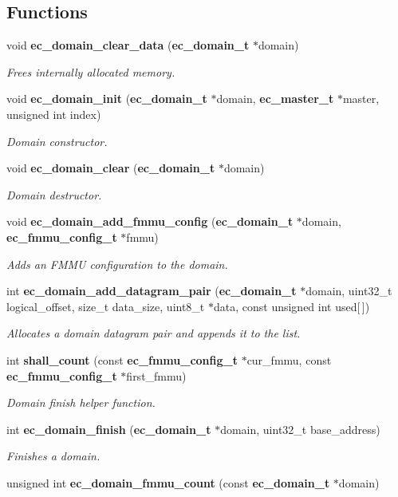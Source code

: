 \subsection*{\-Functions}
\begin{DoxyCompactItemize}
\item 
void {\bf ec\-\_\-domain\-\_\-clear\-\_\-data} ({\bf ec\-\_\-domain\-\_\-t} $\ast$domain)
\begin{DoxyCompactList}\small\item\em \-Frees internally allocated memory. \end{DoxyCompactList}\item 
void {\bf ec\-\_\-domain\-\_\-init} ({\bf ec\-\_\-domain\-\_\-t} $\ast$domain, {\bf ec\-\_\-master\-\_\-t} $\ast$master, unsigned int index)
\begin{DoxyCompactList}\small\item\em \-Domain constructor. \end{DoxyCompactList}\item 
void {\bf ec\-\_\-domain\-\_\-clear} ({\bf ec\-\_\-domain\-\_\-t} $\ast$domain)
\begin{DoxyCompactList}\small\item\em \-Domain destructor. \end{DoxyCompactList}\item 
void {\bf ec\-\_\-domain\-\_\-add\-\_\-fmmu\-\_\-config} ({\bf ec\-\_\-domain\-\_\-t} $\ast$domain, {\bf ec\-\_\-fmmu\-\_\-config\-\_\-t} $\ast$fmmu)
\begin{DoxyCompactList}\small\item\em \-Adds an \-F\-M\-M\-U configuration to the domain. \end{DoxyCompactList}\item 
int {\bf ec\-\_\-domain\-\_\-add\-\_\-datagram\-\_\-pair} ({\bf ec\-\_\-domain\-\_\-t} $\ast$domain, uint32\-\_\-t logical\-\_\-offset, size\-\_\-t data\-\_\-size, uint8\-\_\-t $\ast$data, const unsigned int used[$\,$])
\begin{DoxyCompactList}\small\item\em \-Allocates a domain datagram pair and appends it to the list. \end{DoxyCompactList}\item 
int {\bf shall\-\_\-count} (const {\bf ec\-\_\-fmmu\-\_\-config\-\_\-t} $\ast$cur\-\_\-fmmu, const {\bf ec\-\_\-fmmu\-\_\-config\-\_\-t} $\ast$first\-\_\-fmmu)
\begin{DoxyCompactList}\small\item\em \-Domain finish helper function. \end{DoxyCompactList}\item 
int {\bf ec\-\_\-domain\-\_\-finish} ({\bf ec\-\_\-domain\-\_\-t} $\ast$domain, uint32\-\_\-t base\-\_\-address)
\begin{DoxyCompactList}\small\item\em \-Finishes a domain. \end{DoxyCompactList}\item 
unsigned int {\bf ec\-\_\-domain\-\_\-fmmu\-\_\-count} (const {\bf ec\-\_\-domain\-\_\-t} $\ast$domain)\label{domain_8c_a7af777c7a15fc667d283794dcf2cc498}


\end{DoxyCompactItemize}

